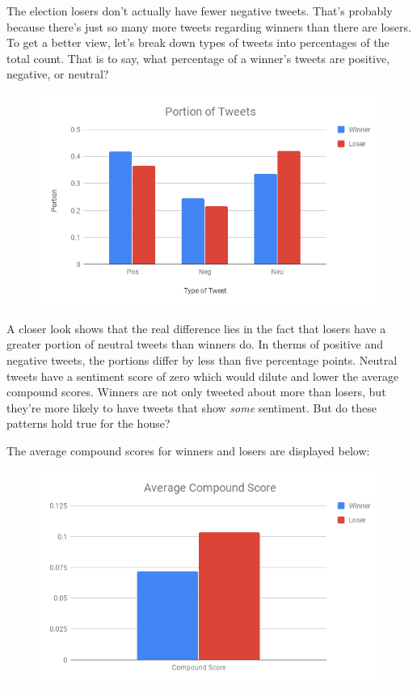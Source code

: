 \documentclass[11pt, twoside, reqno]{book}
\begin{document}
The election losers don't actually have fewer negative tweets. That's probably because there's just so many more tweets regarding winners than there are losers. To get a better view, let's break down types of tweets into percentages of the total count. That is to say, what percentage of a winner's tweets are positive, negative, or neutral?

\begin{figure}[H]
\centering
	\includegraphics[scale=0.5]{tweet_breakdown}	
\end{figure}

A closer look shows that the real difference lies in the fact that losers have a greater portion of neutral tweets than winners do. In therms of positive and negative tweets, the portions differ by less than five percentage points. Neutral tweets have a sentiment score of zero which would dilute and lower the average compound scores. Winners are not only tweeted about more than losers, but they're more likely to have tweets that show \textit{some} sentiment. But do these patterns hold true for the house?

The average compound scores for winners and losers are displayed below:

\begin{figure}[H]
\centering
	\includegraphics[scale=0.5]{house_compound}
\end{figure}
\end{document}

